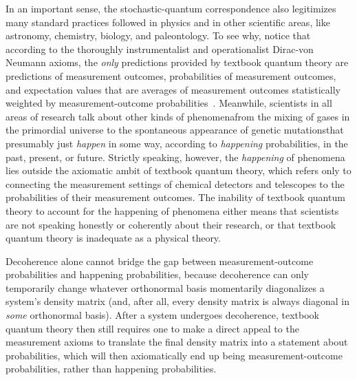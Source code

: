 \documentclass[12pt,english,prl,superscriptaddress,nobibnotes,nofootinbib]{revtex4-2}
\begin{document}
In an important sense, the stochastic-quantum correspondence also
legitimizes many standard practices followed in physics and in other
scientific areas, like astronomy, chemistry, biology, and paleontology.
To see why, notice that according to the thoroughly instrumentalist
and operationalist Dirac-von Neumann axioms, the \emph{only} predictions
provided by textbook quantum theory are predictions of measurement
outcomes, probabilities of measurement outcomes, and expectation values
that are averages of measurement outcomes statistically weighted by
measurement-outcome probabilities~\citep{GriffithsSchroeter:2018iqm,Townsend:2012maqm,Shankar:1994pqm,SakuraiNapolitano:2010mqm,SchumacherWestmoreland:2010qpsi}.
Meanwhile, scientists in all areas of research talk about other kinds
of phenomena\textemdash from the mixing of gases in the primordial
universe to the spontaneous appearance of genetic mutations\textemdash that
presumably just \emph{happen} in some way, according to \emph{happening}
probabilities, in the past, present, or future. Strictly speaking,
however, the \emph{happening} of phenomena lies outside the axiomatic
ambit of textbook quantum theory, which refers only to connecting
the measurement settings of chemical detectors and telescopes to the
probabilities of their measurement outcomes. The inability of textbook
quantum theory to account for the happening of phenomena either means
that scientists are not speaking honestly or coherently about their
research, or that textbook quantum theory is inadequate as a physical
theory.

Decoherence alone cannot bridge the gap between measurement-outcome
probabilities and happening probabilities, because decoherence can
only temporarily change whatever orthonormal basis momentarily diagonalizes
a system's density matrix (and, after all, every density matrix is
always diagonal in \emph{some} orthonormal basis). After a system
undergoes decoherence, textbook quantum theory then still requires
one to make a direct appeal to the measurement axioms to translate
the final density matrix into a statement about probabilities, which
will then axiomatically end up being measurement-outcome probabilities,
rather than happening probabilities.
\end{document}
